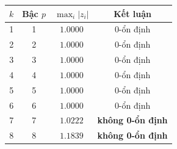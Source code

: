\renewcommand{\arraystretch}{1.25}
\begin{tabular}{cccc}
\toprule
$k$ & Bậc $p$ & $\max_i |z_i|$ & Kết luận\\
\midrule
1 & 1 & $1.0000$ & 0-ổn định\\
2 & 2 & $1.0000$ & 0-ổn định\\
3 & 3 & $1.0000$ & 0-ổn định\\
4 & 4 & $1.0000$ & 0-ổn định\\
5 & 5 & $1.0000$ & 0-ổn định\\
6 & 6 & $1.0000$ & 0-ổn định\\
7 & 7 & $1.0222$ & \textbf{không 0-ổn định}\\
8 & 8 & $1.1839$ & \textbf{không 0-ổn định}\\
\bottomrule
\end{tabular}
